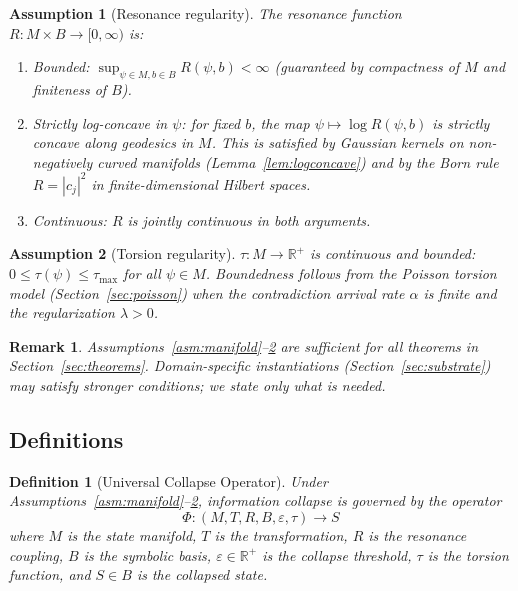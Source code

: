 \documentclass[11pt]{article}
\theoremstyle{plain}
\newtheorem{assumption}{Assumption}
\newtheorem{remark}{Remark}[section]
\newtheorem{definition}{Definition}[section]
\begin{document}
\begin{assumption}[Resonance regularity]\label{asm:resonance}
The resonance function $R : M \times B \to [0, \infty)$ is:
\begin{enumerate}
  \item \emph{Bounded:} $\sup_{\psi \in M, b \in B} R(\psi, b) < \infty$ (guaranteed by
    compactness of $M$ and finiteness of $B$).
  \item \emph{Strictly log-concave in $\psi$:} for fixed $b$, the map $\psi \mapsto \log R(\psi, b)$
    is strictly concave along geodesics in $M$. This is satisfied by Gaussian kernels on
    non-negatively curved manifolds (Lemma~\ref{lem:logconcave}) and by the Born rule
    $R = |c_j|^2$ in finite-dimensional Hilbert spaces.
  \item \emph{Continuous:} $R$ is jointly continuous in both arguments.
\end{enumerate}
\end{assumption}

\begin{assumption}[Torsion regularity]\label{asm:torsion}
$\tau : M \to \mathbb{R}^+$ is continuous and bounded: $0 \leq \tau(\psi) \leq \tau_{\max}$ for all
$\psi \in M$. Boundedness follows from the Poisson torsion model (Section~\ref{sec:poisson}) when
the contradiction arrival rate $\alpha$ is finite and the regularization $\lambda > 0$.
\end{assumption}

\begin{remark}
Assumptions~\ref{asm:manifold}--\ref{asm:torsion} are sufficient for all theorems in
Section~\ref{sec:theorems}. Domain-specific instantiations (Section~\ref{sec:substrate}) may
satisfy stronger conditions; we state only what is needed.
\end{remark}

\subsection{Definitions}

\begin{definition}[Universal Collapse Operator]
Under Assumptions~\ref{asm:manifold}--\ref{asm:torsion}, information collapse is governed by the
operator
\[
  \Phi : (M, T, R, B, \varepsilon, \tau) \to S
\]
where $M$ is the state manifold, $T$ is the transformation, $R$ is the resonance coupling, $B$ is
the symbolic basis, $\varepsilon \in \mathbb{R}^+$ is the collapse threshold, $\tau$ is the torsion
function, and $S \in B$ is the collapsed state.
\end{definition}
\end{document}
